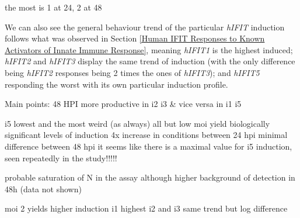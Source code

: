  the most is 1 at 24, 2 at 48
 
 
 
 We can also see the general behaviour trend of the particular \textit{hIFIT} induction follows what was observed in Section \ref{Human IFIT Responses to Known Activators of Innate Immune Response}, meaning \textit{hIFIT1} is the highest induced; \textit{hIFIT2} and \textit{hIFIT3} display the same trend of induction (with the only difference being \textit{hIFIT2} responses being 2 times the ones of \textit{hIFIT3}); and \textit{hIFIT5} responding the worst with its own particular induction profile. 

Main points:
    48 HPI more productive in i2 i3 \& vice versa in i1 i5


    i5 lowest and the most weird (as always)
        all but low moi yield biologically significant levels of induction
        4x increase in conditions between 24 hpi
        minimal difference between 48 hpi
            it seems like there is a maximal value for i5 induction, seen repeatedly in the study!!!!!

    probable saturation of N in the assay although higher background of detection in 48h (data not shown)

    moi 2 yields higher induction
        i1 highest
    i2 and i3 same trend but log difference


